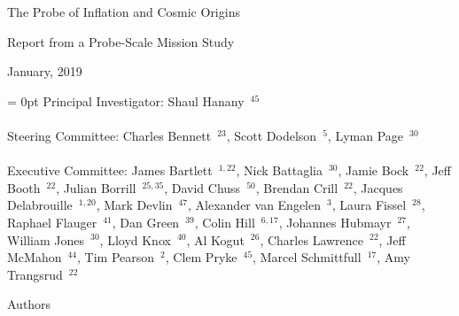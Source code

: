 \documentclass[PICOReport.tex]{subfiles}
\begin{document}

\LARGE{ \centerline{The Probe of Inflation and Cosmic Origins}}
\vspace{0.1in}
\Large{ \centerline{Report from a Probe-Scale Mission Study}}
\Large{ \centerline{January, 2019 }}

\parindent = 0pt
\normalsize{Principal Investigator: Shaul Hanany~$^{45}$ }\\
\vspace{-7pt} \\
\normalsize{Steering Committee: Charles Bennett~$^{23}$, Scott Dodelson~$^{5}$, Lyman Page~$^{30}$ } \\
\vspace{-7pt} \\
\normalsize{Executive Committee: 
James Bartlett~$^{1,22}$,
Nick Battaglia~$^{30}$,
Jamie Bock~$^{22}$, 
Jeff Booth~$^{22}$,
Julian Borrill~$^{25,35}$, 
David Chuss~$^{50}$,
Brendan Crill~$^{22}$, 
Jacques Delabrouille~$^{1,20}$,
Mark Devlin~$^{47}$, 
Alexander van Engelen~$^3$,
Laura Fissel~$^{28}$,
Raphael Flauger~$^{41}$, 
Dan Green~$^{39}$,
Colin Hill~$^{6,17}$,
Johannes Hubmayr~$^{27}$,
William Jones~$^{30}$, 
Lloyd Knox~$^{40}$, 
Al Kogut~$^{26}$, 
Charles Lawrence~$^{22}$, 
Jeff McMahon~$^{44}$, 
Tim Pearson~$^{2}$,
Clem Pryke~$^{45}$, 
Marcel Schmittfull~$^{17}$,
Amy Trangsrud~$^{22}$ 
}
\\


\label{authorlist}

\Large  {\centerline {Authors}}
\end{document}
